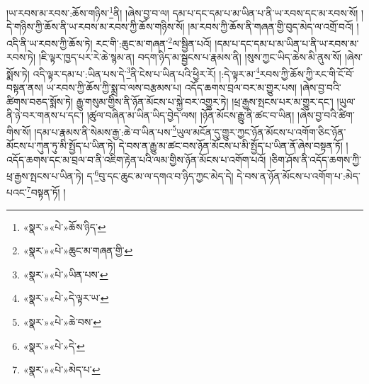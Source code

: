 །ཡ་རབས་མ་རབས་:ཆོས་གཉིས་\footnote{«སྣར་»«པེ་»ཆོས་ཉིད་}ནི། །ཞེས་བྱ་བ་ལ། དམ་པ་དང་དམ་པ་མ་ཡིན་པ་ནི་ཡ་རབས་དང་མ་རབས་སོ། །དེ་གཉིས་ཀྱི་ཆོས་ནི་ཡ་རབས་མ་རབས་ཀྱི་ཆོས་གཉིས་སོ། །མ་རབས་ཀྱི་ཆོས་ནི་གཞན་གྱི་བུད་མེད་ལ་འགྲོ་བའོ། །འདི་ནི་ཡ་རབས་ཀྱི་ཆོས་ཏེ། རང་གི་:ཆུང་མ་གཞན་\footnote{«སྣར་»«པེ་»ཆུང་མ་གཞན་གྱི་}ལ་སྦྱིན་པའོ། །དམ་པ་དང་དམ་པ་མ་ཡིན་པ་ནི་ཡ་རབས་མ་རབས་ཏེ། །ཇི་ལྟར་ཁྱད་པར་རེ་ཆེ་སྙམ་ན། བདག་ཉིད་མ་སྦྱངས་པ་རྣམས་ནི། །སུས་ཀྱང་ཡིད་ཆེས་མི་ནུས་སོ། །ཞེས་སྨོས་ཏེ། འདི་ལྟར་དམ་པ་:ཡིན་པས་དེ་\footnote{«སྣར་»«པེ་»ཡིན་པས་}ནི་ངེས་པ་ཡིན་པའི་ཕྱིར་རོ། །:དེ་ལྟར་མ་\footnote{«སྣར་»«པེ་»དེ་ལྟར་ཡ་}རབས་ཀྱི་ཆོས་ཀྱི་རང་གི་ངོ་བོ་བསྟན་ནས། ཡ་རབས་ཀྱི་ཆོས་ཀྱི་སྨྲ་བ་ལས་བརྩམས་པ། འདོད་ཆགས་བྲལ་བར་མ་གྱུར་པས། །ཞེས་བྱ་བའི་ཚིགས་བཅད་སྨོས་ཏེ། རྒྱུ་གསུམ་གྱིས་ནི་ཉོན་མོངས་པ་སྐྱེ་བར་འགྱུར་ཏེ། །ཕྲ་རྒྱས་སྤངས་པར་མ་གྱུར་དང་། །ཡུལ་ནི་ཉེ་བར་གནས་པ་དང་། །ཚུལ་བཞིན་མ་ཡིན་ཡིད་བྱེད་ལས། །ཉོན་མོངས་རྒྱུ་ནི་ཚང་བ་ཡིན། །ཞེས་བྱ་བའི་ཚིག་གིས་སོ། །དམ་པ་རྣམས་ནི་སེམས་རྒྱ་:ཆེ་བ་ཡིན་པས་\footnote{«སྣར་»«པེ་»ཆེ་བས་}ཡུལ་མངོན་དུ་གྱུར་ཀྱང་ཉོན་མོངས་པ་འགོག་ཅིང་ཉོན་མོངས་པ་ཀུན་ཏུ་མི་སྤྱོད་པ་ཡིན་ཏེ། དེ་བས་ན་རྒྱུ་མ་ཚང་བས་ཉོན་མོངས་པ་མི་སྤྱོད་པ་ཡིན་ནོ་ཞེས་བསྟན་ཏོ། །འདོད་ཆགས་དང་མ་བྲལ་བ་ནི་འཇིག་རྟེན་པའི་ལམ་གྱིས་ཉོན་མོངས་པ་འགོག་པའོ། །ཅིག་ཤོས་ནི་འདོད་ཆགས་ཀྱི་ཕྲ་རྒྱས་སྤངས་པ་ཡིན་ཏེ། ད་\footnote{«སྣར་»«པེ་»དེ་}བུ་དང་ཆུང་མ་ལ་དགའ་བ་ཉིད་ཀྱང་མེད་དེ། དེ་བས་ན་ཉོན་མོངས་པ་འགོག་པ་:མེད་པའང་\footnote{«སྣར་»«པེ་»མེད་པ་}བསྟན་ཏོ། །
